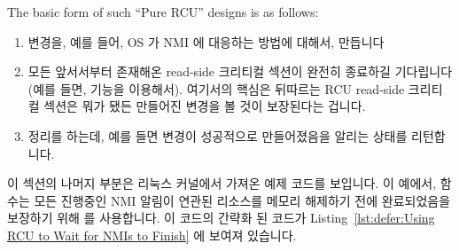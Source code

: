 The basic form of such ``Pure RCU'' designs is as follows:

\fi

\begin{enumerate}
\item	변경을, 예를 들어, OS 가 NMI 에 대응하는 방법에 대해서, 만듭니다
\item	모든 앞서서부터 존재해온 read-side 크리티컬 섹션이 완전히 종료하길
	기다립니다 (예를 들면,  기능을 이용해서).
	여기서의 핵심은 뒤따르는 RCU read-side 크리티컬 섹션은 뭐가 됐든
	만들어진 변경을 볼 것이 보장된다는 겁니다.
\item	정리를 하는데, 예를 들면 변경이 성공적으로 만들어졌음을 알리는 상태를
	리턴합니다.

\end{enumerate}

이 섹션의 나머지 부분은 리눅스 커널에서 가져온 예제 코드를 보입니다.
이 예에서,  함수는 모든 진행중인 NMI 알림이 연관된 리소스를
메모리 해제하기 전에 완료되었음을 보장하기 위해  를
사용합니다.
이 코드의 간략화 된 코드가
Listing~\ref{lst:defer:Using RCU to Wait for NMIs to Finish} 에 보여져
있습니다.


